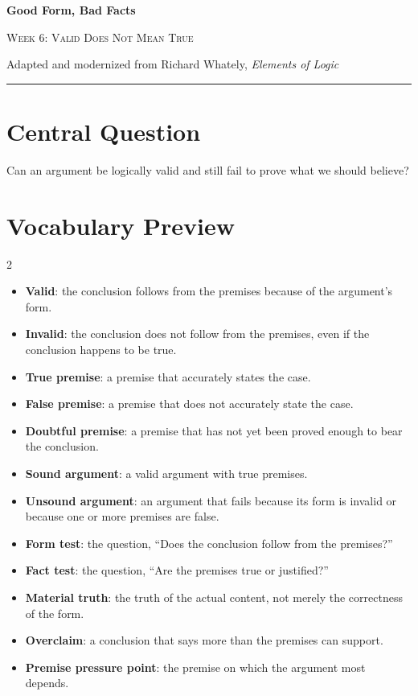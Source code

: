 \documentclass[12pt]{article}
\begin{document}
\begin{center}
{\LARGE\bfseries Good Form, Bad Facts}\par\vspace{0.25em}
{\large\scshape Week 6: Valid Does Not Mean True}\par\vspace{0.5em}
{Adapted and modernized from Richard Whately, \textit{Elements of Logic}}\par\vspace{0.6em}
\rule{0.82\textwidth}{0.4pt}
\end{center}

\section*{Central Question}
Can an argument be logically valid and still fail to prove what we should believe?

\section*{Vocabulary Preview}
\begin{multicols}{2}
\begin{itemize}[leftmargin=*, itemsep=0.18em]
\item \textbf{Valid}: the conclusion follows from the premises because of the argument's form.
\item \textbf{Invalid}: the conclusion does not follow from the premises, even if the conclusion happens to be true.
\item \textbf{True premise}: a premise that accurately states the case.
\item \textbf{False premise}: a premise that does not accurately state the case.
\item \textbf{Doubtful premise}: a premise that has not yet been proved enough to bear the conclusion.
\item \textbf{Sound argument}: a valid argument with true premises.
\item \textbf{Unsound argument}: an argument that fails because its form is invalid or because one or more premises are false.
\item \textbf{Form test}: the question, ``Does the conclusion follow from the premises?''
\item \textbf{Fact test}: the question, ``Are the premises true or justified?''
\item \textbf{Material truth}: the truth of the actual content, not merely the correctness of the form.
\item \textbf{Overclaim}: a conclusion that says more than the premises can support.
\item \textbf{Premise pressure point}: the premise on which the argument most depends.
\end{itemize}
\end{multicols}
\end{document}
